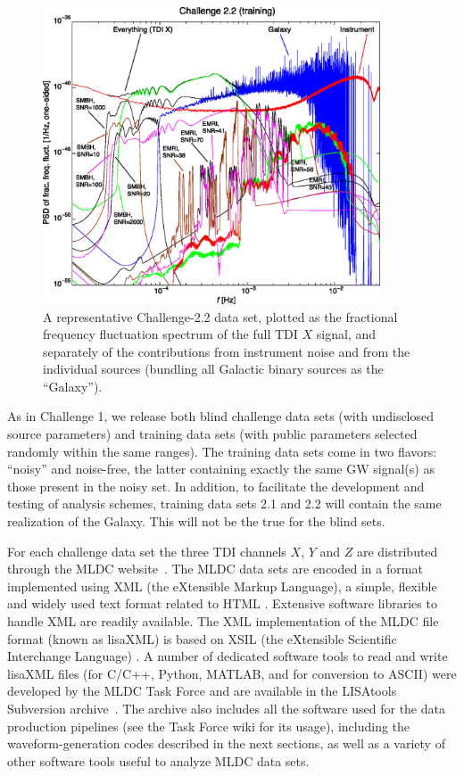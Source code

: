 \documentclass{iopart}
\begin{document}
\begin{figure}[htb]
\centerline{\includegraphics[width=10cm]{challenge-2c}}
\caption{\protect\footnotesize
A representative Challenge-2.2 data set, plotted as the fractional frequency fluctuation spectrum of the full TDI $X$ signal, and separately of the contributions from instrument noise and from the individual sources (bundling all Galactic binary sources as the ``Galaxy'').}
\label{f:C2.2}
\end{figure}

As in Challenge 1, we release both blind challenge data sets (with undisclosed source parameters) and training data sets (with public parameters selected randomly within the same ranges). The training data sets come in two flavors: ``noisy'' and noise-free, the latter containing exactly the same GW signal(s) as those present in the noisy set. In addition, to facilitate the development and testing of analysis schemes, training data sets 2.1 and 2.2 will contain the same realization of the Galaxy. This will not be the true for the blind sets. 

For each challenge data set the three TDI channels $X$, $Y$ and $Z$ are distributed through the MLDC website~\cite{MLDCweb}. The MLDC data sets are encoded in a format implemented using XML (the eXtensible Markup Language), a simple, flexible and widely used text format related to HTML \cite{xml}. Extensive software libraries to handle XML are readily available. The XML implementation of the MLDC file format (known as lisaXML) is based on XSIL (the eXtensible Scientific Interchange Language) \cite{xsil}. A number of dedicated software tools to read and write lisaXML files (for C/C++, Python, MATLAB, and for conversion to ASCII) were developed by the MLDC Task Force and are available in the LISAtools Subversion archive~\cite{lisatools}. The archive also includes all the software used for the data production pipelines (see the Task Force wiki \cite{MLDCwiki} for its usage), including the waveform-generation codes described in the next sections, as well as a variety of other software tools useful to analyze MLDC data sets.
\end{document}
